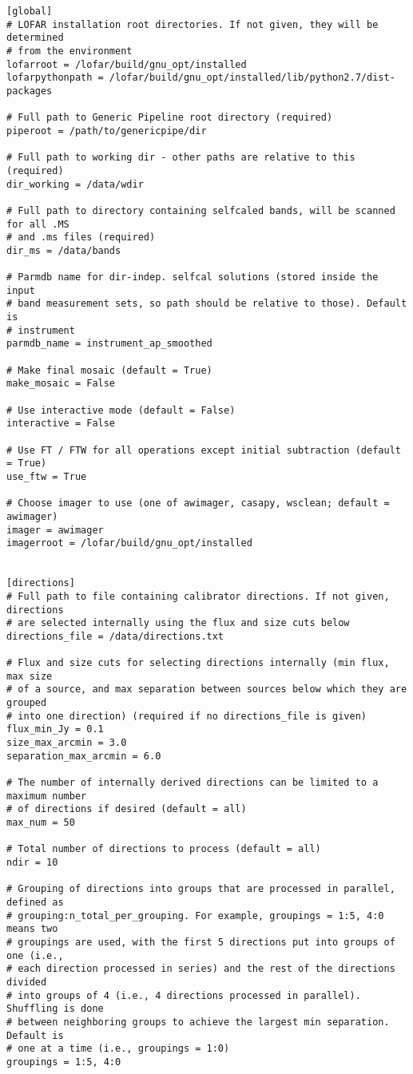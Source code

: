 \documentclass[structabstract]{article}
\begin{document}
\begin{verbatim}
[global]
# LOFAR installation root directories. If not given, they will be determined
# from the environment
lofarroot = /lofar/build/gnu_opt/installed
lofarpythonpath = /lofar/build/gnu_opt/installed/lib/python2.7/dist-packages

# Full path to Generic Pipeline root directory (required)
piperoot = /path/to/genericpipe/dir

# Full path to working dir - other paths are relative to this (required)
dir_working = /data/wdir

# Full path to directory containing selfcaled bands, will be scanned for all .MS
# and .ms files (required)
dir_ms = /data/bands

# Parmdb name for dir-indep. selfcal solutions (stored inside the input
# band measurement sets, so path should be relative to those). Default is
# instrument
parmdb_name = instrument_ap_smoothed

# Make final mosaic (default = True)
make_mosaic = False

# Use interactive mode (default = False)
interactive = False

# Use FT / FTW for all operations except initial subtraction (default = True)
use_ftw = True

# Choose imager to use (one of awimager, casapy, wsclean; default = awimager)
imager = awimager
imagerroot = /lofar/build/gnu_opt/installed


[directions]
# Full path to file containing calibrator directions. If not given, directions
# are selected internally using the flux and size cuts below
directions_file = /data/directions.txt

# Flux and size cuts for selecting directions internally (min flux, max size
# of a source, and max separation between sources below which they are grouped
# into one direction) (required if no directions_file is given)
flux_min_Jy = 0.1
size_max_arcmin = 3.0
separation_max_arcmin = 6.0

# The number of internally derived directions can be limited to a maximum number
# of directions if desired (default = all)
max_num = 50

# Total number of directions to process (default = all)
ndir = 10

# Grouping of directions into groups that are processed in parallel, defined as
# grouping:n_total_per_grouping. For example, groupings = 1:5, 4:0 means two
# groupings are used, with the first 5 directions put into groups of one (i.e.,
# each direction processed in series) and the rest of the directions divided
# into groups of 4 (i.e., 4 directions processed in parallel). Shuffling is done
# between neighboring groups to achieve the largest min separation. Default is
# one at a time (i.e., groupings = 1:0)
groupings = 1:5, 4:0



\end{verbatim}
\end{document}
